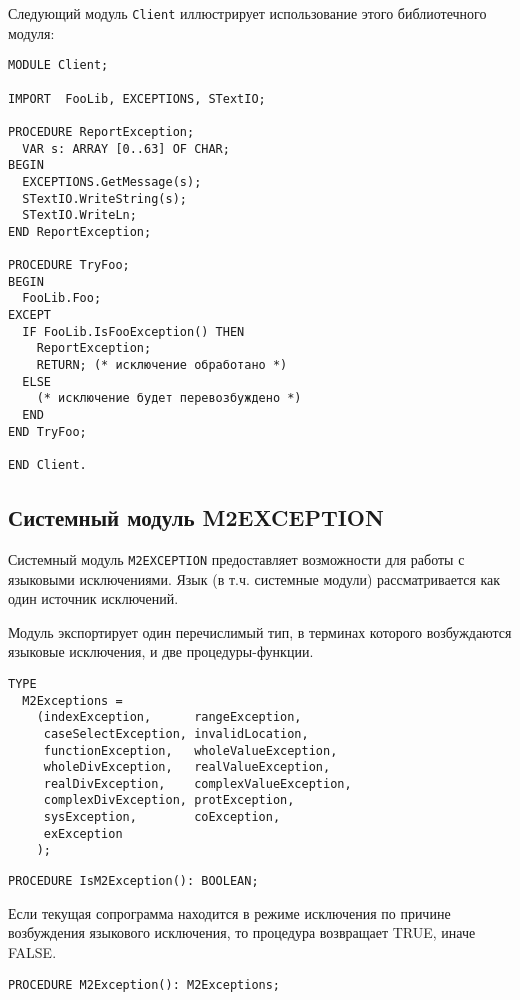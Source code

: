 Следующий модуль {\tt Client} иллюстрирует использование этого
библиотечного модуля:
\begin{verbatim}
MODULE Client;

IMPORT  FooLib, EXCEPTIONS, STextIO;

PROCEDURE ReportException;
  VAR s: ARRAY [0..63] OF CHAR;
BEGIN
  EXCEPTIONS.GetMessage(s);
  STextIO.WriteString(s);
  STextIO.WriteLn;
END ReportException;

PROCEDURE TryFoo;
BEGIN
  FooLib.Foo;
EXCEPT
  IF FooLib.IsFooException() THEN
    ReportException;
    RETURN; (* исключение обработано *)
  ELSE
    (* исключение будет перевозбуждено *)
  END
END TryFoo;

END Client.
\end{verbatim}

\subsection{Системный модуль M2EXCEPTION}\label{m2:m2exception}

Системный модуль {\tt M2EXCEPTION} предоставляет возможности для 
работы с языковыми исключениями. Язык (в т.ч. системные модули)
рассматривается как один источник исключений.

Модуль экспортирует один перечислимый тип, в терминах которого 
возбуждаются языковые исключения, и две процедуры-функции.

\begin{verbatim}
TYPE
  M2Exceptions =
    (indexException,      rangeException,
     caseSelectException, invalidLocation,
     functionException,   wholeValueException,
     wholeDivException,   realValueException,
     realDivException,    complexValueException,
     complexDivException, protException,
     sysException,        coException,
     exException
    );
\end{verbatim}

\begin{verbatim}
PROCEDURE IsM2Exception(): BOOLEAN;
\end{verbatim}

Если текущая сопрограмма находится в режиме исключения по 
причине возбуждения языкового исключения,
то процедура возвращает TRUE, иначе FALSE.

\begin{verbatim}
PROCEDURE M2Exception(): M2Exceptions;
\end{verbatim}

